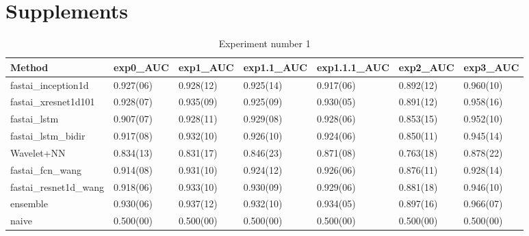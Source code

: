 \section*{Supplements}

\begin{table}[hp]
\scriptsize
\caption{Experiment number 1}
\begin{tabular}{lllllll}
\cellcolor[HTML]{C0C0C0}\textbf{Method} & \cellcolor[HTML]{C0C0C0}\textbf{exp0\_AUC} & \cellcolor[HTML]{C0C0C0}\textbf{exp1\_AUC} & \cellcolor[HTML]{C0C0C0}\textbf{exp1.1\_AUC} & \cellcolor[HTML]{C0C0C0}\textbf{exp1.1.1\_AUC} & \cellcolor[HTML]{C0C0C0}\textbf{exp2\_AUC} & \cellcolor[HTML]{C0C0C0}\textbf{exp3\_AUC} \\\hline
fastai\_inception1d         & 0.927(06) & 0.928(12) & 0.925(14) & 0.917(06) & 0.892(12) & 0.960(10) \\
fastai\_xresnet1d101        & 0.928(07) & 0.935(09) & 0.925(09) & 0.930(05) & 0.891(12) & 0.958(16) \\
fastai\_lstm                & 0.907(07) & 0.928(11) & 0.929(08) & 0.928(06) & 0.853(15) & 0.952(10) \\
fastai\_lstm\_bidir         & 0.917(08) & 0.932(10) & 0.926(10) & 0.924(06) & 0.850(11) & 0.945(14) \\
Wavelet+NN                  & 0.834(13) & 0.831(17) & 0.846(23) & 0.871(08) & 0.763(18) & 0.878(22) \\
fastai\_fcn\_wang           & 0.914(08) & 0.931(10) & 0.924(12) & 0.926(06) & 0.876(11) & 0.928(14) \\
fastai\_resnet1d\_wang      & 0.918(06) & 0.933(10) & 0.930(09) & 0.929(06) & 0.881(18) & 0.946(10) \\
ensemble                    & 0.930(06) & 0.937(12) & 0.932(10) & 0.934(05) & 0.897(16) & 0.966(07) \\
naive                       & 0.500(00) & 0.500(00) & 0.500(00) & 0.500(00) & 0.500(00) & 0.500(00) \\\hline                              
\end{tabular}
\end{table}

